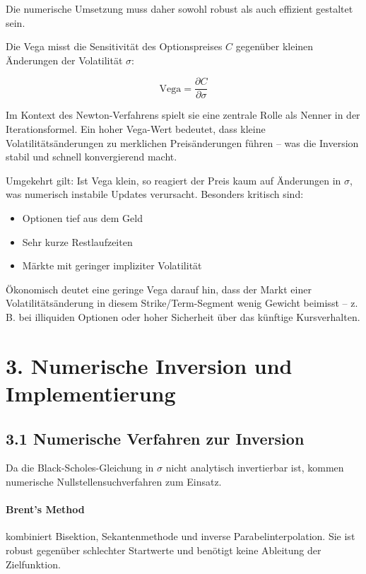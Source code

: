 \documentclass[a4paper,12pt]{article}
\begin{document}
Die numerische Umsetzung muss daher sowohl robust als auch effizient gestaltet sein.
\begin{tcolorbox}[title=Ökonomische Interpretation von Vega $\left( \frac{\partial C}{\partial \sigma} \right)$]
    Die Vega misst die Sensitivität des Optionspreises $C$ gegenüber kleinen Änderungen der Volatilität $\sigma$:
    
    \[
    \text{Vega} = \frac{\partial C}{\partial \sigma}
    \]
    
    Im Kontext des Newton-Verfahrens spielt sie eine zentrale Rolle als Nenner in der Iterationsformel. Ein hoher Vega-Wert bedeutet, dass kleine Volatilitätsänderungen zu merklichen Preisänderungen führen – was die Inversion stabil und schnell konvergierend macht.
    
    Umgekehrt gilt: Ist Vega klein, so reagiert der Preis kaum auf Änderungen in $\sigma$, was numerisch instabile Updates verursacht. Besonders kritisch sind:
    \begin{itemize}
      \item Optionen tief aus dem Geld
      \item Sehr kurze Restlaufzeiten
      \item Märkte mit geringer impliziter Volatilität
    \end{itemize}
    
    Ökonomisch deutet eine geringe Vega darauf hin, dass der Markt einer Volatilitätsänderung in diesem Strike/Term-Segment wenig Gewicht beimisst – z.\,B. bei illiquiden Optionen oder hoher Sicherheit über das künftige Kursverhalten.
    \end{tcolorbox}


\section*{3. Numerische Inversion und Implementierung}

\subsection*{3.1 Numerische Verfahren zur Inversion}

Da die Black-Scholes-Gleichung in $\sigma$ nicht analytisch invertierbar ist, kommen numerische Nullstellensuchverfahren zum Einsatz.

\paragraph{Brent's Method} kombiniert Bisektion, Sekantenmethode und inverse Parabelinterpolation. Sie ist robust gegenüber schlechter Startwerte und benötigt keine Ableitung der Zielfunktion.
\end{document}
